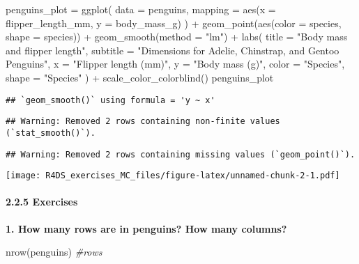 \documentclass[
]{article}
\newenvironment{Shaded}{\begin{snugshade}}{\end{snugshade}}
\newcommand{\AttributeTok}[1]{\textcolor[rgb]{0.77,0.63,0.00}{#1}}
\newcommand{\CommentTok}[1]{\textcolor[rgb]{0.56,0.35,0.01}{\textit{#1}}}
\newcommand{\FunctionTok}[1]{\textcolor[rgb]{0.00,0.00,0.00}{#1}}
\newcommand{\NormalTok}[1]{#1}
\newcommand{\OtherTok}[1]{\textcolor[rgb]{0.56,0.35,0.01}{#1}}
\newcommand{\SpecialCharTok}[1]{\textcolor[rgb]{0.00,0.00,0.00}{#1}}
\newcommand{\StringTok}[1]{\textcolor[rgb]{0.31,0.60,0.02}{#1}}
\begin{document}
\begin{Shaded}
\begin{Highlighting}[]
\NormalTok{penguins\_plot }\OtherTok{=} \FunctionTok{ggplot}\NormalTok{(}
  \AttributeTok{data =}\NormalTok{ penguins,}
  \AttributeTok{mapping =} \FunctionTok{aes}\NormalTok{(}\AttributeTok{x =}\NormalTok{ flipper\_length\_mm, }\AttributeTok{y =}\NormalTok{ body\_mass\_g)}
\NormalTok{) }\SpecialCharTok{+}
  \FunctionTok{geom\_point}\NormalTok{(}\FunctionTok{aes}\NormalTok{(}\AttributeTok{color =}\NormalTok{ species, }\AttributeTok{shape =}\NormalTok{ species)) }\SpecialCharTok{+}
  \FunctionTok{geom\_smooth}\NormalTok{(}\AttributeTok{method =} \StringTok{"lm"}\NormalTok{) }\SpecialCharTok{+}
  \FunctionTok{labs}\NormalTok{(}
    \AttributeTok{title =} \StringTok{"Body mass and flipper length"}\NormalTok{,}
    \AttributeTok{subtitle =} \StringTok{"Dimensions for Adelie, Chinstrap, and Gentoo Penguins"}\NormalTok{,}
    \AttributeTok{x =} \StringTok{"Flipper length (mm)"}\NormalTok{, }\AttributeTok{y =} \StringTok{"Body mass (g)"}\NormalTok{,}
    \AttributeTok{color =} \StringTok{"Species"}\NormalTok{, }\AttributeTok{shape =} \StringTok{"Species"}
\NormalTok{  ) }\SpecialCharTok{+}
  \FunctionTok{scale\_color\_colorblind}\NormalTok{()}
\NormalTok{penguins\_plot}
\end{Highlighting}
\end{Shaded}

\begin{verbatim}
## `geom_smooth()` using formula = 'y ~ x'
\end{verbatim}

\begin{verbatim}
## Warning: Removed 2 rows containing non-finite values (`stat_smooth()`).
\end{verbatim}

\begin{verbatim}
## Warning: Removed 2 rows containing missing values (`geom_point()`).
\end{verbatim}

\texttt{[image: R4DS\_exercises\_MC\_files/figure-latex/unnamed-chunk-2-1.pdf]}

\hypertarget{exercises}{%
\paragraph{2.2.5 Exercises}\label{exercises}}

\textbf{1. How many rows are in penguins? How many columns?}

\begin{Shaded}
\begin{Highlighting}[]
\FunctionTok{nrow}\NormalTok{(penguins) }\CommentTok{\#rows}
\end{Highlighting}
\end{Shaded}
\end{document}

